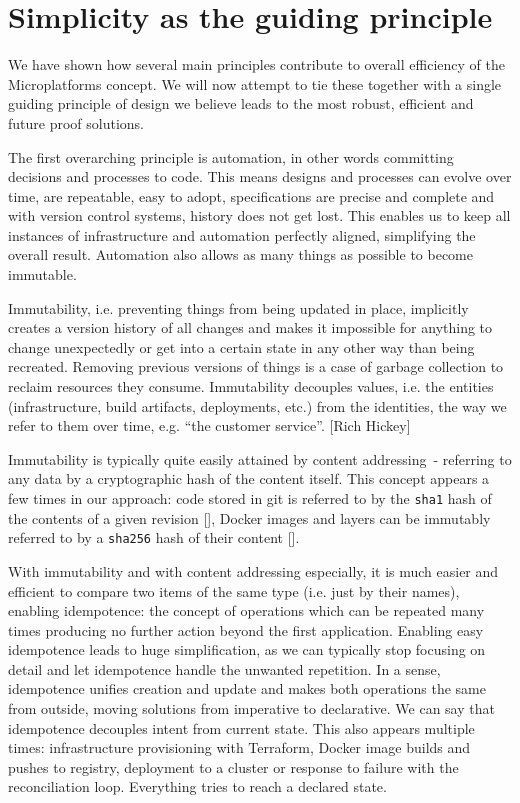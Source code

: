 \documentclass[reprint,amsmath,amssymb,aps]{revtex4-1}
\begin{document}
\section{\label{sec:simplicity}Simplicity as the guiding principle}

We have shown how several main principles contribute to overall efficiency of the Microplatforms concept. We will now attempt to tie these together with a single guiding principle of design we believe leads to the most robust, efficient and future proof solutions.

The first overarching principle is automation, in other words committing decisions and processes to code. This means designs and processes can evolve over time, are repeatable, easy to adopt, specifications are precise and complete and with version control systems, history does not get lost. This enables us to keep all instances of infrastructure and automation perfectly aligned, simplifying the overall result. Automation also allows as many things as possible to become immutable.

Immutability, i.e. preventing things from being updated in place, implicitly creates a version history of all changes and makes it impossible for anything to change unexpectedly or get into a certain state in any other way than being recreated. Removing previous versions of things is a case of garbage collection to reclaim resources they consume. Immutability decouples values, i.e. the entities (infrastructure, build artifacts, deployments, etc.) from the identities, the way we refer to them over time, e.g. “the customer service”. [Rich Hickey]

Immutability is typically quite easily attained by content addressing~- referring to any data by a cryptographic hash of the content itself. This concept appears a few times in our approach: code stored in git is referred to by the \texttt{sha1} hash of the contents of a given revision [], Docker images and layers can be immutably referred to by a \texttt{sha256} hash of their content [].

With immutability and with content addressing especially, it is much easier and efficient to compare two items of the same type (i.e. just by their names), enabling idempotence: the concept of operations which can be repeated many times producing no further action beyond the first application. Enabling easy idempotence leads to huge simplification, as we can typically stop focusing on detail and let idempotence handle the unwanted repetition. In a sense, idempotence unifies creation and update and makes both operations the same from outside, moving solutions from imperative to declarative. We can say that idempotence decouples intent from current state. This also appears multiple times: infrastructure provisioning with Terraform, Docker image builds and pushes to registry, deployment to a cluster or response to failure with the reconciliation loop. Everything tries to reach a declared state.
\end{document}
